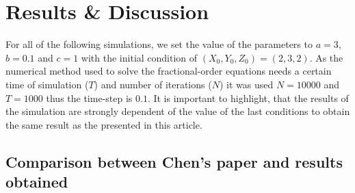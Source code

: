 \section{Results \& Discussion}
For all of the following simulations, we set the value of the parameters to $a=3$, $b=0.1$ and $c=1$ with the initial condition of $(X_0,Y_0,Z_0)=(2,3,2)$. As the numerical method used to solve the fractional-order equations needs a certain time of simulation ($T$) and number of iterations ($N$) it was used $N=10000$ and $T=1000$ thus the time-step is $0.1$. It is important to highlight, that the results of the simulation are strongly dependent of the value of the last conditions to obtain the same result as the presented in this article.  
\subsection{Comparison between Chen's paper and results obtained}
